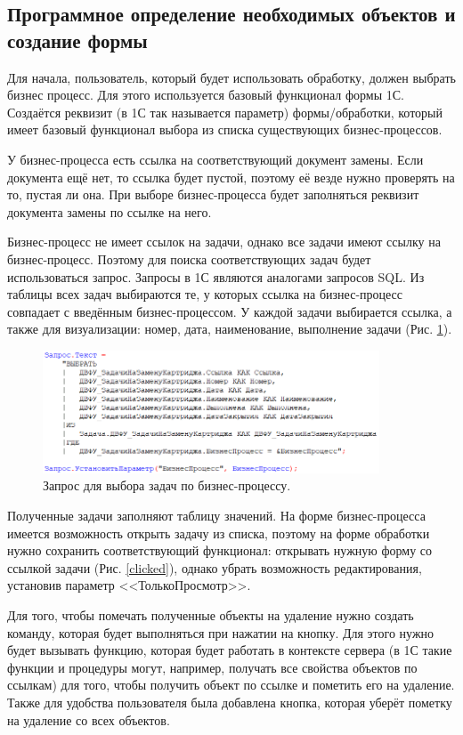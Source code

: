     \subsection{Программное определение необходимых объектов и создание формы}
    Для начала, пользователь, который будет использовать обработку, должен выбрать бизнес процесс. Для этого используется базовый функционал формы 1С. Создаётся реквизит (в 1С так называется параметр) формы/обработки, который имеет базовый функционал выбора из списка существующих бизнес-процессов. 

    У бизнес-процесса есть ссылка на соответствующий документ замены. Если документа ещё нет, то ссылка будет пустой, поэтому её везде нужно проверять на то, пустая ли она. При выборе бизнес-процесса будет заполняться реквизит документа замены по ссылке на него.
    
    Бизнес-процесс не имеет ссылок на задачи, однако все задачи имеют ссылку на бизнес-процесс. Поэтому для поиска соответствующих задач будет использоваться запрос. Запросы в 1С являются аналогами запросов SQL. Из таблицы всех задач выбираются те, у которых ссылка на бизнес-процесс совпадает с введённым бизнес-процессом. У каждой задачи выбирается ссылка, а также для визуализации: номер, дата, наименование, выполнение задачи (Рис. \ref{query1}).
    
    \begin{figure}[H]
        \centering
        \includegraphics[width=10cm]{pictures/query1.png}
        \caption{Запрос для выбора задач по бизнес-процессу.}  \label{query1}
    \end{figure}
    
    Полученные задачи заполняют таблицу значений. На форме бизнес-процесса имеется возможность открыть задачу из списка, поэтому на форме обработки нужно сохранить соответствующий функционал: открывать нужную форму со ссылкой задачи (Рис. \ref{clicked}), однако убрать возможность редактирования, установив параметр <<ТолькоПросмотр>>.

    Для того, чтобы помечать полученные объекты на удаление нужно создать команду, которая будет выполняться при нажатии на кнопку. Для этого нужно будет вызывать функцию, которая будет работать в контексте сервера (в 1С такие функции и процедуры могут, например, получать все свойства объектов по ссылкам) для того, чтобы получить объект по ссылке и пометить его на удаление. Также для удобства пользователя была добавлена кнопка, которая уберёт пометку на удаление со всех объектов.

